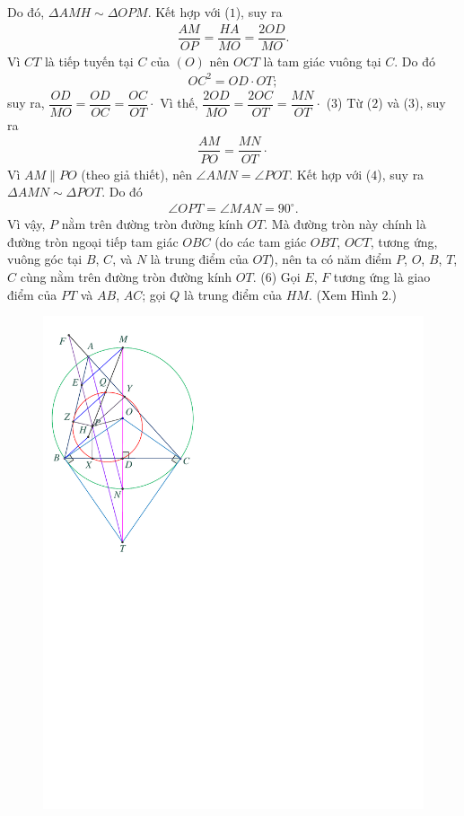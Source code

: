 \begin{multicols}{2}
	Do đó, $\Delta AMH \sim \Delta OPM$. Kết hợp với ($1$), suy ra
	\begin{align*}
		\dfrac{{AM}}{{OP}} = \dfrac{{HA}}{{MO}} = \dfrac{{2OD}}{{MO}}. \tag{$2$}
	\end{align*}
	Vì $CT$ là tiếp tuyến tại $C$ của $(O)$ nên $OCT$ là tam giác vuông tại $C$. Do đó
	\begin{align*}
		O{C^2} = OD \cdot OT;
	\end{align*}
	suy ra, $\dfrac{{OD}}{{MO}} = \dfrac{{OD}}{{OC}} = \dfrac{{OC}}{{OT}} \cdot$
	\vskip 0.05cm
	Vì thế, $\dfrac{{2OD}}{{MO}} = \dfrac{{2OC}}{{OT}} = \dfrac{{MN}}{{OT}} \cdot$ \hfill ($3$)
	\vskip 0.05cm
	Từ ($2$) và ($3$), suy ra
	\begin{align*}
		\dfrac{{AM}}{{PO}} = \dfrac{{MN}}{{OT}} \cdot \tag{$4$}
	\end{align*}
	Vì $AM \parallel PO$ (theo giả thiết), nên \linebreak$\angle AMN = \angle POT$.  Kết hợp với ($4$), suy ra $\Delta AMN \sim  \Delta POT$. Do đó
	\begin{align*}
		\angle OPT = \angle MAN = 90^\circ. \tag{$5$}
	\end{align*}
	Vì vậy, $P$ nằm trên đường tròn đường kính $OT$. Mà đường tròn này chính là đường tròn ngoại tiếp tam giác $OBC$ (do các tam giác $OBT$, $OCT$, tương ứng, vuông góc tại $B$, $C$, và $N$ là trung điểm của $OT$), nên ta có năm điểm $P$, $O$, $B$, $T$, $C$ cùng nằm trên đường tròn đường kính $OT$. \hfill                                            ($6$)
	\vskip 0.05cm
	Gọi $E$, $F$ tương ứng là giao điểm của $PT$ và $AB$, $AC$; gọi $Q$ là trung điểm của $HM$. (Xem Hình $2$.)
	\begin{figure}[H]
		\centering
		\captionsetup{labelformat= empty, justification=centering}
		\includegraphics[width=0.7\linewidth]{P619H2}

\end{figure}
\end{multicols}
